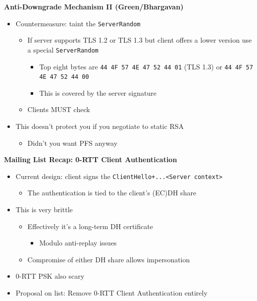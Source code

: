 \documentclass[helvetica]{seminar}
\newcommand{\heading}[1]{%
  \begin{center} 
    \large\bf 
    #1 
  \end{center} 
  \vspace{.4 in}}
\begin{document}
\begin{slide}
\heading{Anti-Downgrade Mechanism II (Green/Bhargavan)}

\begin{itemize}
\item Countermeasure: taint the \verb^ServerRandom^
  \begin{itemize}
  \item If server supports TLS 1.2 or TLS 1.3 but client offers a lower version use a special \verb^ServerRandom^
    \begin{itemize}
    \item Top eight bytes are \verb^44 4F 57 4E 47 52 44 01^ (TLS 1.3) or \verb^44 4F 57 4E 47 52 44 00^
    \item This is covered by the server signature
    \end{itemize}
  \item Clients MUST check
  \end{itemize}

\item This doesn't protect you if you negotiate to static RSA
  \begin{itemize}
  \item Didn't you want PFS anyway
  \end{itemize}
\end{itemize}
\end{slide}



\begin{slide}
\heading{Mailing List Recap: 0-RTT Client Authentication}

\begin{itemize}
\item Current design: client signs the \verb^ClientHello+...<Server context>^
  \begin{itemize}
  \item The authentication is tied to the client's (EC)DH share
  \end{itemize}

\item This is very brittle
  \begin{itemize}
  \item Effectively it's a long-term DH certificate
    \begin{itemize}
    \item Modulo anti-replay issues
    \end{itemize}
  \item Compromise of either DH share allows impersonation
  \end{itemize}

\item 0-RTT PSK also scary

\item Proposal on list: Remove 0-RTT Client Authentication entirely
\end{itemize}
\end{slide}
\end{document}
